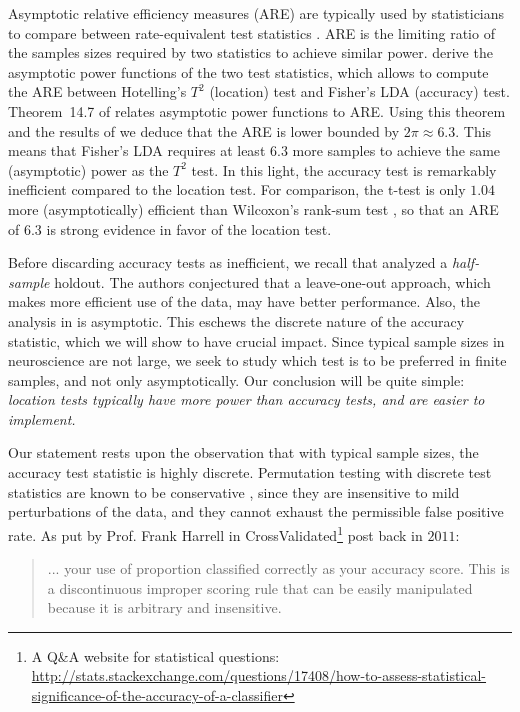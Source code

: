 \documentclass[12pt,a4paper]{article}
\begin{document}
Asymptotic relative efficiency measures (ARE) are typically used by statisticians to compare between rate-equivalent test statistics \citep{vaart_asymptotic_1998}.
ARE is the limiting ratio of the samples sizes required by two statistics to achieve similar power. 
\cite{ramdas_classification_2016} derive the asymptotic power functions of the two test statistics, which allows to compute the ARE between Hotelling's $T^2$ (location) test and Fisher's LDA (accuracy) test.
Theorem~14.7 of \cite{vaart_asymptotic_1998} relates asymptotic power functions to ARE.
Using this theorem and the results of \cite{ramdas_classification_2016} we deduce that the ARE is lower bounded by $2 \pi \approx 6.3$. 
This means that Fisher's LDA requires at least $6.3$ more samples to achieve the same (asymptotic) power as the $T^2$ test. 
In this light, the accuracy test is remarkably inefficient compared to the location test.  
For comparison, the t-test is only $1.04$ more (asymptotically) efficient than Wilcoxon's rank-sum test \citep{lehmann_parametric_2009}, so that an ARE of $6.3$ is strong evidence in favor of the location test. 

Before discarding accuracy tests as inefficient, we recall that \cite{ramdas_classification_2016} analyzed a \emph{half-sample} holdout. 
The authors conjectured that a leave-one-out approach, which makes more efficient use of the data, may have better performance. 
Also, the analysis in \cite{ramdas_classification_2016} is asymptotic. 
This eschews the discrete nature of the accuracy statistic, which we will show to have  crucial impact. 
Since typical sample sizes in neuroscience are not large, we seek to study which test is to be preferred in finite samples, and not only asymptotically.
Our conclusion will be quite simple: {\em location tests typically have more power than accuracy tests, and are easier to implement.}

Our statement rests upon the observation that with typical sample sizes, the accuracy test statistic is highly discrete. 
Permutation testing with discrete test statistics are known to be conservative \citep{hemerik_exact_2014}, since they are insensitive to mild perturbations of the data, and they cannot exhaust the permissible false positive rate. 
As put by Prof. Frank Harrell in \textsf{CrossValidated\footnote{A Q\&A website for statistical questions: \url{http://stats.stackexchange.com/questions/17408/how-to-assess-statistical-significance-of-the-accuracy-of-a-classifier}}} post back in $2011$:
\begin{quote}
	... your use of proportion classified correctly as your accuracy score. This is a discontinuous improper scoring rule that can be easily manipulated because it is arbitrary and insensitive.
\end{quote}
\end{document}
